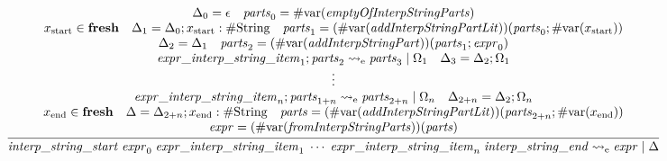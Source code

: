 \begin{gather*}
    \infer{\mathit{interp\_string\_start}\; \mathit{expr}_0\; \mathit{expr\_interp\_string\_item}_1\; \cdots\; \mathit{expr\_interp\_string\_item}_n\; \mathit{interp\_string\_end} \rightsquigarrow_\mathrm{e} \mathit{expr} \mid \Delta}{
        \begin{array}{c}
            \Delta_0 = \epsilon
            \hspace{1em}
            \mathit{parts}_0 = \mathrm{\#var}(\mathit{emptyOfInterpStringParts})
            \\
            x_\mathrm{start} \in \mathbf{fresh}
            \hspace{1em}
            \Delta_1 = \Delta_0; x_\mathrm{start}: \mathrm{\#String}
            \hspace{1em}
            \mathit{parts}_1 = (\mathrm{\#var}(\mathit{addInterpStringPartLit}))(\mathit{parts}_0; \mathrm{\#var}(x_\mathrm{start}))
            \\
            \Delta_2 = \Delta_1
            \hspace{1em}
            \mathit{parts}_2 = (\mathrm{\#var}(\mathit{addInterpStringPart}))(\mathit{parts}_1; \mathit{expr}_0)
            \\
            \mathit{expr\_interp\_string\_item}_1; \mathit{parts}_2 \rightsquigarrow_\mathrm{e} \mathit{parts}_3 \mid \Omega_1
            \hspace{1em}
            \Delta_3 = \Delta_2; \Omega_1
            \\
            \vdots
            \\
            \mathit{expr\_interp\_string\_item}_n; \mathit{parts}_{1 + n} \rightsquigarrow_\mathrm{e} \mathit{parts}_{2 + n} \mid \Omega_n
            \hspace{1em}
            \Delta_{2 + n} = \Delta_2; \Omega_n
            \\
            x_\mathrm{end} \in \mathbf{fresh}
            \hspace{1em}
            \Delta = \Delta_{2 + n}; x_\mathrm{end}: \mathrm{\#String}
            \hspace{1em}
            \mathit{parts} = (\mathrm{\#var}(\mathit{addInterpStringPartLit}))(\mathit{parts}_{2 + n}; \mathrm{\#var}(x_\mathrm{end}))
            \\
            \mathit{expr} = (\mathrm{\#var}(\mathit{fromInterpStringParts}))(\mathit{parts})
        \end{array}
    }
\end{gather*}

